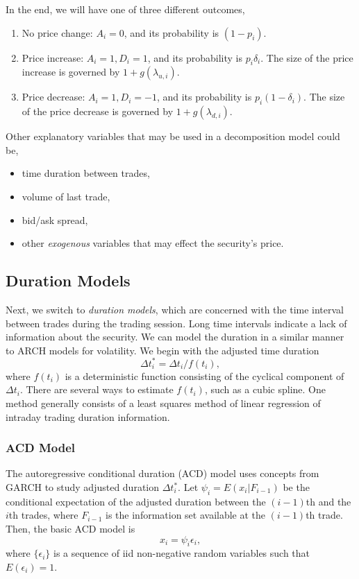 In the end, we will have one of three different outcomes,
\begin{enumerate}
\item No price change: $A_i=0$, and its probability is $(1-p_i)$.
\item Price increase: $A_i=1, D_i=1$, and its probability is $p_i \delta_i$. The size of the price increase is governed by $1+g(\lambda_{u,i})$.
\item Price decrease: $A_i=1, D_i=-1$, and its probability is $p_i(1-\delta_i)$. The size of the price decrease is governed by $1+g(\lambda_{d,i})$.
\end{enumerate}

\bigskip
Other explanatory variables that may be used in a decomposition model could be,
\begin{itemize}
\item time duration between trades,
\item volume of last trade,
\item bid/ask spread,
\item other \emph{exogenous} variables that may effect the security's price.
\end{itemize}

\subsection{Duration Models}
Next, we switch to \emph{duration models}, which are concerned with the time interval between trades during the trading session. Long time intervals indicate a lack of information about the security. We can model the duration in a similar manner to ARCH models for volatility. We begin with the adjusted time duration
\[
\Delta t^*_i = \Delta t_i / f(t_i),
\]
where $f(t_i)$ is a deterministic function consisting of the cyclical component of $\Delta t_i$. There are several ways to estimate $f(t_i)$, such as a cubic spline. One method generally consists of a least squares method of linear regression of intraday trading duration information.

\subsubsection{ACD Model}
The autoregressive conditional duration (ACD) model uses concepts from GARCH to study adjusted duration $\Delta t^*_i$. Let $\psi_i=E(x_i | F_{i-1})$ be the conditional expectation of the adjusted duration between the $(i-1)$th and the $i$th trades, where $F_{i-1}$ is the information set available at the $(i-1)$th trade. Then, the basic ACD model is
\[
x_i = \psi_i \epsilon_i,
\]
where $\{\epsilon_i\}$ is a sequence of iid  non-negative random variables such that $E(\epsilon_i)=1$.

